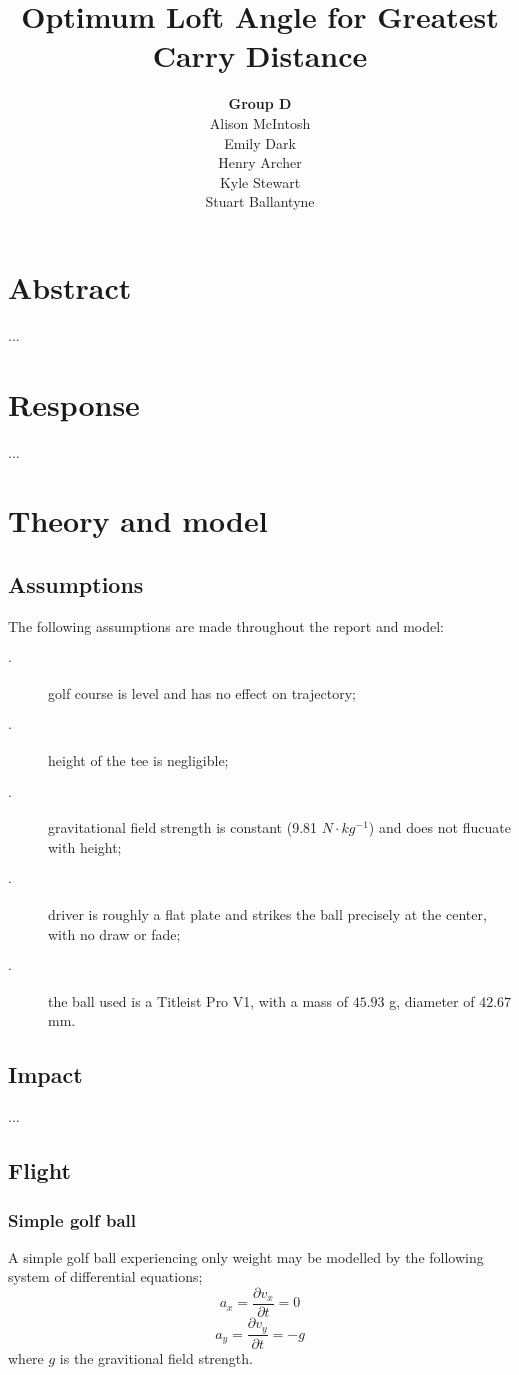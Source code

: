\documentclass[12pt]{article}
\title{\textbf{Optimum Loft Angle for Greatest Carry Distance}}
\author{\textbf{Group D}\\
		Alison McIntosh\\
		Emily Dark\\
		Henry Archer\\
		Kyle Stewart\\
		Stuart Ballantyne}
\date{}
\begin{document}
\begin{titlepage}
\maketitle
\thispagestyle{empty}
\pagebreak
\end{titlepage}


\section{Abstract}
...


\section{Response}
...

\section{Theory and model}

\subsection{Assumptions}
The following assumptions are made throughout the report and model:
\begin{description}
  \item[$\cdot$] golf course is level and has no effect on trajectory;
  \item[$\cdot$] height of the tee is negligible;
  \item[$\cdot$] gravitational field strength is constant (9.81 $N\cdot kg^{-1}$) and does not flucuate with height;
  \item[$\cdot$] driver is roughly a flat plate and strikes the ball precisely at the center, with no draw or fade;
  \item[$\cdot$] the ball used is a Titleist Pro V1, with a mass of $45.93$ g, diameter of $42.67$ mm.

\end{description}

\subsection{Impact}
...
\pagebreak
\subsection{Flight}
\subsubsection{Simple golf ball}
A simple golf ball experiencing only weight may be modelled by the following system of differential equations;
\begin{equation}
a_x=\frac{\partial v_x}{\partial t}=0
\end{equation}
\begin{equation}
a_y=\frac{\partial v_y}{\partial t}=-g
\end{equation}
where $g$ is the gravitional field strength.
\end{document}
